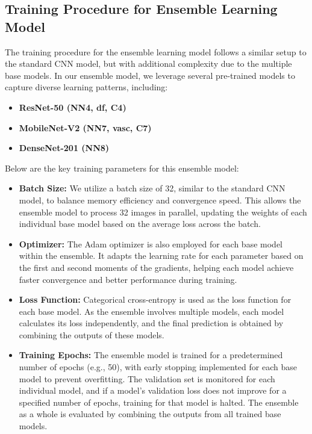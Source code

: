 \documentclass{article}
\begin{document}
\subsection{Training Procedure for Ensemble Learning Model}

The training procedure for the ensemble learning model follows a similar setup to the standard CNN model, but with additional complexity due to the multiple base models. In our ensemble model, we leverage several pre-trained models to capture diverse learning patterns, including:

\begin{itemize}
   
    \item \textbf{ResNet-50 (NN4, df, C4)}
    \item \textbf{MobileNet-V2 (NN7, vasc, C7)}
    \item \textbf{DenseNet-201 (NN8)}
\end{itemize}

Below are the key training parameters for this ensemble model:

\begin{itemize}
    \item \textbf{Batch Size:} We utilize a batch size of 32, similar to the standard CNN model, to balance memory efficiency and convergence speed. This allows the ensemble model to process 32 images in parallel, updating the weights of each individual base model based on the average loss across the batch.
    \item \textbf{Optimizer:} The Adam optimizer is also employed for each base model within the ensemble. It adapts the learning rate for each parameter based on the first and second moments of the gradients, helping each model achieve faster convergence and better performance during training.
    \item \textbf{Loss Function:} Categorical cross-entropy is used as the loss function for each base model. As the ensemble involves multiple models, each model calculates its loss independently, and the final prediction is obtained by combining the outputs of these models.
    \item \textbf{Training Epochs:} The ensemble model is trained for a predetermined number of epochs (e.g., 50), with early stopping implemented for each base model to prevent overfitting. The validation set is monitored for each individual model, and if a model's validation loss does not improve for a specified number of epochs, training for that model is halted. The ensemble as a whole is evaluated by combining the outputs from all trained base models.
\end{itemize}
\end{document}
